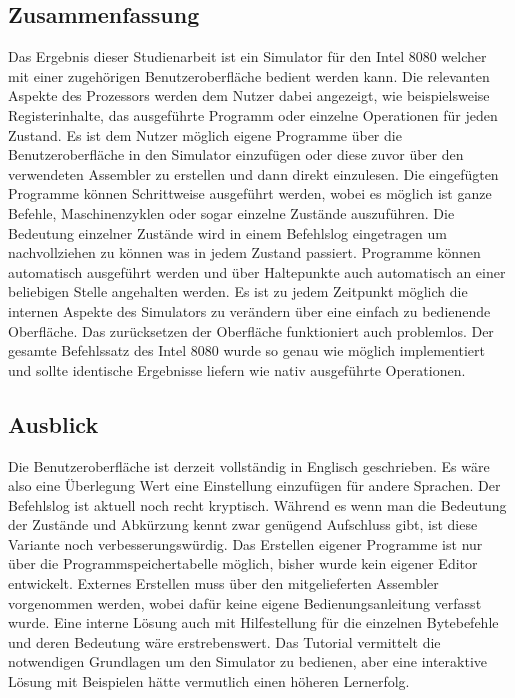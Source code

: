 \documentclass[12pt]{article}
\begin{document}
\subsection{Zusammenfassung}
Das Ergebnis dieser Studienarbeit ist ein Simulator für den Intel 8080 welcher mit einer zugehörigen Benutzeroberfläche bedient werden kann. Die relevanten Aspekte des Prozessors werden dem Nutzer dabei angezeigt, wie beispielsweise Registerinhalte, das ausgeführte Programm oder einzelne Operationen für jeden Zustand. Es ist dem Nutzer möglich eigene Programme über die Benutzeroberfläche in den Simulator einzufügen oder diese zuvor über den verwendeten Assembler zu erstellen und dann direkt einzulesen. Die eingefügten Programme können Schrittweise ausgeführt werden, wobei es möglich ist ganze Befehle, Maschinenzyklen oder sogar einzelne Zustände auszuführen. Die Bedeutung einzelner Zustände wird in einem Befehlslog eingetragen um nachvollziehen zu können was in jedem Zustand passiert. Programme können automatisch ausgeführt werden und über Haltepunkte auch automatisch an einer beliebigen Stelle angehalten werden. Es ist zu jedem Zeitpunkt möglich die internen Aspekte des Simulators zu verändern über eine einfach zu bedienende Oberfläche. Das zurücksetzen der Oberfläche funktioniert auch problemlos. Der gesamte Befehlssatz des Intel 8080 wurde so genau wie möglich implementiert und sollte identische Ergebnisse liefern wie nativ ausgeführte Operationen.

\subsection{Ausblick}
Die Benutzeroberfläche ist derzeit vollständig in Englisch geschrieben. Es wäre also eine Überlegung Wert eine Einstellung einzufügen für andere Sprachen. Der Befehlslog ist aktuell noch recht kryptisch. Während es wenn man die Bedeutung der Zustände und Abkürzung kennt zwar genügend Aufschluss gibt, ist diese Variante noch verbesserungswürdig. Das Erstellen eigener Programme ist nur über die Programmspeichertabelle möglich, bisher wurde kein eigener Editor entwickelt. Externes Erstellen muss über den mitgelieferten Assembler vorgenommen werden, wobei dafür keine eigene Bedienungsanleitung verfasst wurde. Eine interne Lösung auch mit Hilfestellung für die einzelnen Bytebefehle und deren Bedeutung wäre erstrebenswert. Das Tutorial vermittelt die notwendigen Grundlagen um den Simulator zu bedienen, aber eine interaktive Lösung mit Beispielen hätte vermutlich einen höheren Lernerfolg.
\end{document}
